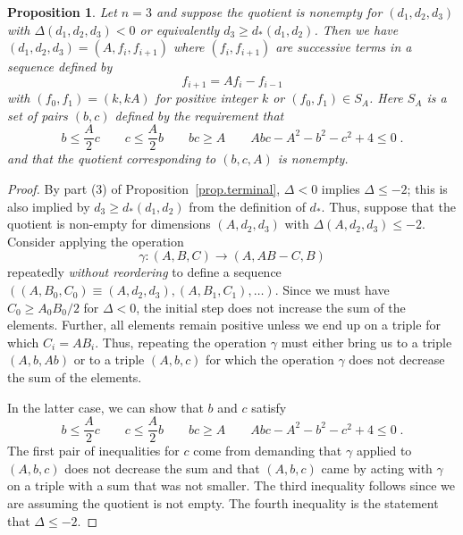 \documentclass[12pt]{article}
\newtheorem{proposition}[theorem]{Proposition}
\theoremstyle{definition}
\newcommand{\be}{\begin{equation}}
\newcommand{\ee}{\end{equation}}
\begin{document}
\begin{proposition}\label{prop.Fib}
Let $n=3$ and suppose the quotient is nonempty for $(d_1,d_2,d_3)$ with $\Delta(d_1,d_2,d_3) < 0$ or equivalently $d_3 \ge d_*(d_1,d_2)$. Then we have $(d_1,d_2,d_3) = (A, f_i, f_{i+1})$ where $(f_i,f_{i+1})$ are successive terms in a sequence defined by
\be
\label{Fib}
f_{i+1} = A f_i - f_{i-1}
\ee
with $(f_0,f_1) = (k,kA)$ for positive integer $k$ or $(f_0,f_1) \in S_A$. Here $S_A$ is a set of pairs $(b,c)$ defined by the requirement that
\be
\label{Sregion}
 b \le  \frac{A}{2} c \qquad  c \le \frac{A}{2} b  \qquad bc \ge A \qquad Abc - A^2 - b^2 - c^2 + 4 \le 0  \; .
\ee
and that the quotient corresponding to $(b,c,A)$ is nonempty.
\end{proposition}
\begin{proof}
By part (3) of Proposition~\ref{prop.terminal}, $\Delta < 0$ implies $\Delta \le -2$; this is also implied by $d_3 \ge d_*(d_1,d_2)$ from the definition of $d_*$. Thus, suppose that the quotient is non-empty for dimensions $(A,d_2,d_3)$ with $\Delta(A,d_2,d_3) \le -2$. Consider applying the operation
\be
\gamma: (A,B,C) \to (A, A B - C, B)
\ee
repeatedly {\it without reordering} to define a sequence $((A,B_0,C_0) \equiv (A,d_2,d_3),(A,B_1,C_1), \dots)$. Since we must have $C_0 \ge A_0 B_0/2$ for $\Delta < 0$, the initial step does not increase the sum of the elements. Further, all elements remain positive unless we end up on a triple for which $C_i = A B_i$. Thus, repeating the operation $\gamma$ must either bring us to a triple $(A,b,Ab)$ or to a triple $(A,b,c)$ for which the operation $\gamma$ does not decrease the sum of the elements.

In the latter case, we can show that $b$ and $c$ satisfy
\be
 b \le  \frac{A}{2} c \qquad  c \le \frac{A}{2} b \qquad bc \ge A \qquad Abc - A^2 - b^2 - c^2 + 4 \le 0  \; .
\ee
The first pair of inequalities for $c$ come from demanding that $\gamma$ applied to $(A,b,c)$ does not decrease the sum and that $(A,b,c)$ came by acting with $\gamma$ on a triple with a sum that was not smaller. The third inequality follows since we are assuming the quotient is not empty. The fourth inequality is the statement that $\Delta \le -2$.


\end{proof}
\end{document}
